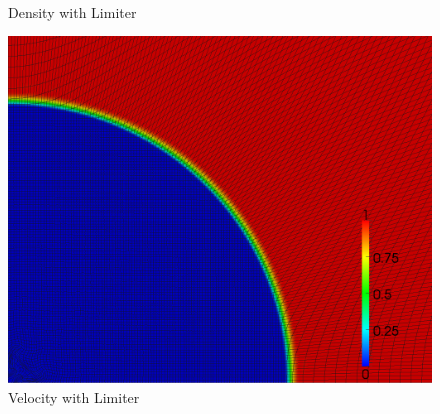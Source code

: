 \documentclass[8pt,xcolor=svgnames]{beamer}
\begin{document}
\begin{frame}
\begin{columns}
\begin{column}{0.3\textwidth}
\begin{figure}[t]
\begin{center}
\\Density with Limiter
\end{center}
\end{figure}
\begin{figure}[t]
\begin{center}
\includegraphics[height=0.9\textwidth]{figs/Noh/Q2l-7-velocity.png}
\\Velocity with Limiter
\end{center}
\end{figure}
\end{column}
\end{columns}
\end{frame}
\end{document}
